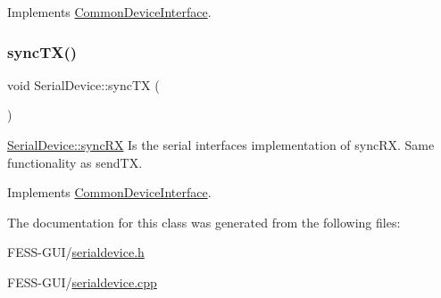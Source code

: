 Implements \hyperlink{class_common_device_interface_ac0166ca78cba5ae57a4803978af9e78c}{Common\+Device\+Interface}.

\hypertarget{class_serial_device_a8e53f81ff51ef332a03c3276804a32c8}{}\label{class_serial_device_a8e53f81ff51ef332a03c3276804a32c8} 
\subsubsection{\texorpdfstring{sync\+T\+X()}{syncTX()}}
{\footnotesize\ttfamily void Serial\+Device\+::sync\+TX (\begin{DoxyParamCaption}{ }\end{DoxyParamCaption})\hspace{0.3cm}{\ttfamily [virtual]}}



\hyperlink{class_serial_device_a79c9685f76771703557b2044e941f27a}{Serial\+Device\+::sync\+RX} Is the serial interface\textquotesingle{}s implementation of sync\+RX. Same functionality as send\+TX. 



Implements \hyperlink{class_common_device_interface_acae4ab2226a4f1388b2af355ac2e4f86}{Common\+Device\+Interface}.



The documentation for this class was generated from the following files\+:\begin{DoxyCompactItemize}
\item 
F\+E\+S\+S-\/\+G\+U\+I/\hyperlink{serialdevice_8h}{serialdevice.\+h}\item 
F\+E\+S\+S-\/\+G\+U\+I/\hyperlink{serialdevice_8cpp}{serialdevice.\+cpp}\end{DoxyCompactItemize}
